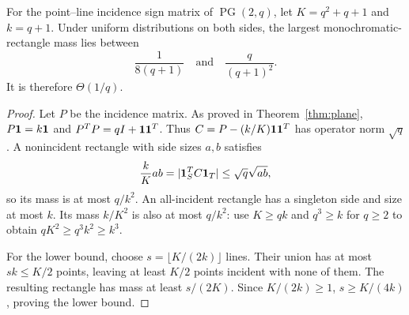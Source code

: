 \begin{proposition}\label{prop:pg-rect}
For the point--line incidence sign matrix of $\operatorname{PG}(2,q)$, let $K=q^2+q+1$ and $k=q+1$. Under uniform distributions on both sides, the largest monochromatic-rectangle mass lies between
\[
 \frac1{8(q+1)}\quad\text{and}\quad\frac{q}{(q+1)^2}.
\]
It is therefore $\Theta(1/q)$.
\end{proposition}

\begin{proof}
Let $P$ be the incidence matrix. As proved in Theorem~\ref{thm:plane}, $P\mathbf 1=k\mathbf 1$ and $P^TP=qI+\mathbf 1\mathbf 1^T$. Thus $C=P-(k/K)\mathbf 1\mathbf 1^T$ has operator norm $\sqrt q$. A nonincident rectangle with side sizes $a,b$ satisfies
\[
 \frac{k}{K}ab=|\mathbf 1_S^TC\mathbf 1_T|\le\sqrt q\sqrt{ab},
\]
so its mass is at most $q/k^2$. An all-incident rectangle has a singleton side and size at most $k$. Its mass $k/K^2$ is also at most $q/k^2$: use $K\ge qk$ and $q^3\ge k$ for $q\ge2$ to obtain $qK^2\ge q^3k^2\ge k^3$.

For the lower bound, choose $s=\lfloor K/(2k)\rfloor$ lines. Their union has at most $sk\le K/2$ points, leaving at least $K/2$ points incident with none of them. The resulting rectangle has mass at least $s/(2K)$. Since $K/(2k)\ge1$, $s\ge K/(4k)$, proving the lower bound.
\end{proof}

